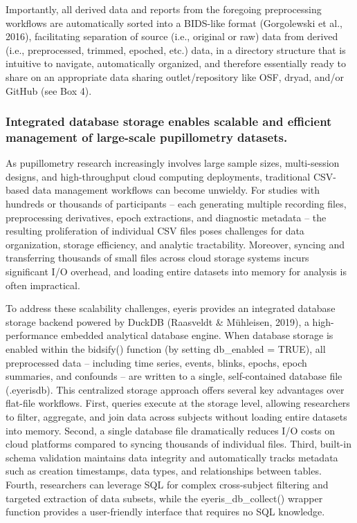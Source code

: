 Importantly, all derived data and reports from the foregoing preprocessing workflows are automatically sorted into a BIDS-like format (Gorgolewski et al., 2016), facilitating separation of source (i.e., original or raw) data from derived (i.e., preprocessed, trimmed, epoched, etc.) data, in a directory structure that is intuitive to navigate, automatically organized, and therefore essentially ready to share on an appropriate data sharing outlet/repository like OSF, dryad, and/or GitHub (see Box 4).

\subsubsection{Integrated database storage enables scalable and efficient management of large-scale pupillometry datasets.}
As pupillometry research increasingly involves large sample sizes, multi-session designs, and high-throughput cloud computing deployments, traditional CSV-based data management workflows can become unwieldy. For studies with hundreds or thousands of participants – each generating multiple recording files, preprocessing derivatives, epoch extractions, and diagnostic metadata – the resulting proliferation of individual CSV files poses challenges for data organization, storage efficiency, and analytic tractability. Moreover, syncing and transferring thousands of small files across cloud storage systems incurs significant I/O overhead, and loading entire datasets into memory for analysis is often impractical.

To address these scalability challenges, eyeris provides an integrated database storage backend powered by DuckDB (Raasveldt \& Mühleisen, 2019), a high-performance embedded analytical database engine. When database storage is enabled within the bidsify() function (by setting db\_enabled = TRUE), all preprocessed data – including time series, events, blinks, epochs, epoch summaries, and confounds – are written to a single, self-contained database file (.eyerisdb). This centralized storage approach offers several key advantages over flat-file workflows. First, queries execute at the storage level, allowing researchers to filter, aggregate, and join data across subjects without loading entire datasets into memory. Second, a single database file dramatically reduces I/O costs on cloud platforms compared to syncing thousands of individual files. Third, built-in schema validation maintains data integrity and automatically tracks metadata such as creation timestamps, data types, and relationships between tables. Fourth, researchers can leverage SQL for complex cross-subject filtering and targeted extraction of data subsets, while the eyeris\_db\_collect() wrapper function provides a user-friendly interface that requires no SQL knowledge.

